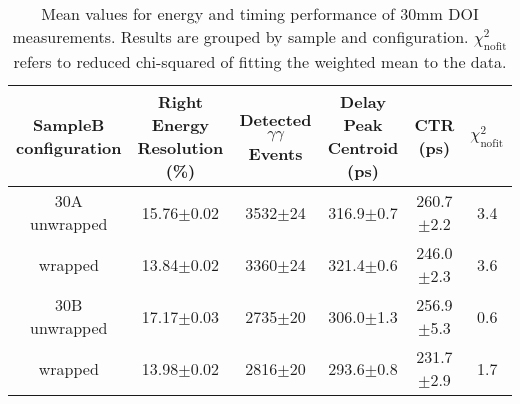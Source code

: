 \begin{table}
\caption{\label{tab:doictrresults} Mean values for energy and timing performance of 30mm DOI measurements. Results are grouped by sample and configuration. $\chi^2_\text{nofit}$ refers to reduced chi-squared of fitting the weighted mean to the data.}
\begin{tabular}{cccccc}
\hline
SampleB configuration & Right Energy Resolution (\%) & Detected $\gamma\gamma$ Events & Delay Peak Centroid (ps)  & CTR (ps) &  $\chi^2_\text{nofit}$ \\
\hline
30A     unwrapped     &  15.76$\pm$0.02 &  3532$\pm$24 &  316.9$\pm$0.7 &  260.7$\pm$2.2 &    3.4 \\
        wrapped       &  13.84$\pm$0.02 &  3360$\pm$24 &  321.4$\pm$0.6 &  246.0$\pm$2.3 &    3.6 \\
30B     unwrapped     &  17.17$\pm$0.03 &  2735$\pm$20 &  306.0$\pm$1.3 &  256.9$\pm$5.3 &    0.6 \\
        wrapped       &  13.98$\pm$0.02 &  2816$\pm$20 &  293.6$\pm$0.8 &  231.7$\pm$2.9 &    1.7 \\
\hline
\end{tabular}
\end{table}

